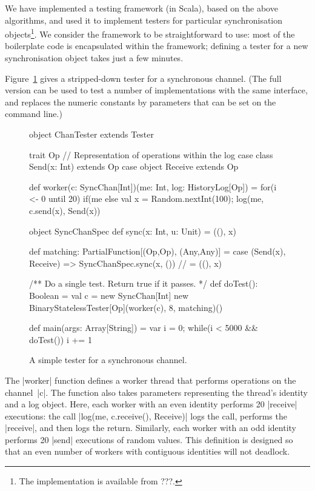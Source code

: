 We have implemented a testing framework (in Scala), based on the above
algorithms, and used it to implement testers for particular synchronisation
objects\footnote{The implementation is available from ???.}.  We consider the
framework to be straightforward to use: most of the boilerplate code is
encapsulated within the framework; defining a tester for a new synchronisation
object takes just a few minutes.

Figure~\ref{fig:ChanTester} gives a stripped-down tester for a synchronous
channel.  (The full version can be used to test a number of implementations
with the same interface, and replaces the numeric constants by parameters that
can be set on the command line.)


\begin{figure}
\begin{scala}
object ChanTester extends Tester{
  trait Op   // Representation of operations within the log
  case class Send(x: Int) extends Op
  case object Receive extends Op

  def worker(c: SyncChan[Int])(me: Int, log: HistoryLog[Op]) = 
    for(i <- 0 until 20)
      if(me%
      else{ val x = Random.nextInt(100); log(me, c.send(x), Send(x)) }

  object SyncChanSpec{
    def sync(x: Int, u: Unit) = ((), x)    
  }

  def matching: PartialFunction[(Op,Op), (Any,Any)] = {
    case (Send(x), Receive) => SyncChanSpec.sync(x, ()) // = ((), x)
  }

  /** Do a single test.  Return true if it passes. */
  def doTest(): Boolean = {
    val c = new SyncChan[Int]
    new BinaryStatelessTester[Op](worker(c), 8, matching)()
  }

  def main(args: Array[String]) = {
    var i = 0; while(i < 5000 && doTest()) i += 1
  }
}
\end{scala}
\caption{A simple tester for a synchronous channel. \label{fig:ChanTester}}
\end{figure}


The |worker| function defines a worker thread that performs operations on the
channel~|c|.  The function also takes parameters representing the thread's
identity and a log object.  Here, each worker with an even identity performs
20 |receive| executions: the call |log(me, c.receive(), Receive)| logs the
call, performs the |receive|, and then logs the return.  Similarly, each
worker with an odd identity performs 20 |send| executions of random values.
This definition is designed so that an even number of workers with contiguous
identities will not deadlock. 

